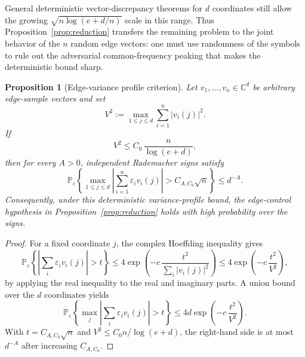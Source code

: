 \documentclass[11pt]{amsart}
\numberwithin{equation}{section}
\newtheorem{proposition}[theorem]{Proposition}
\theoremstyle{definition}
\theoremstyle{remark}
\newcommand{\C}{\mathbb C}
\newcommand{\Prob}{\mathbb P}
\newcommand{\abs}[1]{\left\lvert #1\right\rvert}
\newcommand{\eps}{\varepsilon}
\begin{document}
General deterministic vector-discrepancy theorems for \(d\) coordinates still
allow the growing \(\sqrt{n\log(e+d/n)}\) scale in this range. Thus
Proposition~\ref{prop:reduction} transfers the remaining problem to the joint
behavior of the \(n\) random edge vectors: one must use randomness of the symbols
to rule out the adversarial common-frequency peaking that makes the deterministic
bound sharp.

\begin{proposition}[Edge-variance profile criterion]\label{prop:variance-profile}
Let \(v_1,\ldots,v_n\in\C^d\) be arbitrary edge-sample vectors and set
\[
  V^2:=\max_{1\le j\le d}\sum_{i=1}^n \abs{v_i(j)}^2 .
\]
If
\[
  V^2\le C_0\,\frac{n}{\log(e+d)},
\]
then for every \(A>0\), independent Rademacher signs satisfy
\[
  \Prob_\eps\left\{
    \max_{1\le j\le d}\abs{\sum_{i=1}^n\eps_i v_i(j)}
    > C_{A,C_0}\sqrt n
  \right\}\le d^{-A}.
\]
Consequently, under this deterministic variance-profile bound, the edge-control
hypothesis in Proposition~\ref{prop:reduction} holds with high probability over
the signs.
\end{proposition}

\begin{proof}
For a fixed coordinate \(j\), the complex Hoeffding inequality gives
\[
  \Prob_\eps\left\{\abs{\sum_i\eps_i v_i(j)}>t\right\}
  \le 4\exp\left(-c\,\frac{t^2}{\sum_i\abs{v_i(j)}^2}\right)
  \le 4\exp\left(-c\,\frac{t^2}{V^2}\right),
\]
by applying the real inequality to the real and imaginary parts. A union bound
over the \(d\) coordinates yields
\[
  \Prob_\eps\left\{\max_j\abs{\sum_i\eps_i v_i(j)}>t\right\}
  \le 4d\exp\left(-c\,\frac{t^2}{V^2}\right).
\]
With \(t=C_{A,C_0}\sqrt n\) and \(V^2\le C_0 n/\log(e+d)\), the right-hand side
is at most \(d^{-A}\) after increasing \(C_{A,C_0}\).
\end{proof}
\end{document}
